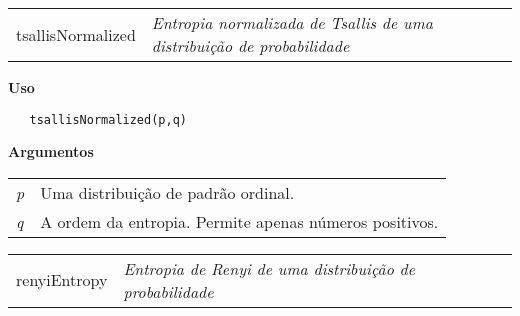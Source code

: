 \documentclass[12pt,letterpaper]{article}
\begin{document}
\newpage

\hrulefill   

\begin{table}[!h]
\begin{center}
\begin{tabularx}{\textwidth}{ X X}
\hspace{0.5cm} tsallisNormalized & \textit{Entropia normalizada de Tsallis de uma distribuição de probabilidade}\\
\end{tabularx}
\end{center}
\end{table} 

\vspace{-0.5cm}

\hrulefill  

\vspace{0.5cm}

\textbf{Uso}

\begin{lstlisting}
   tsallisNormalized(p,q)
\end{lstlisting}

\vspace{0.5cm}

\textbf{Argumentos}

\begin{table}[!h]
\begin{center}
\begin{tabularx}{\textwidth}{X X}
\hspace{0.5cm} \textit{p} \vspace{0.5cm}& Uma distribuição de padrão ordinal.\vspace{0.5cm}\\
\hspace{0.5cm} \textit{q} \vspace{0.5cm}&  A ordem da entropia. Permite apenas números positivos.\vspace{0.5cm}\\
\end{tabularx}
\end{center}
\end{table} 


\hrulefill   

\begin{table}[!h]
\begin{center}
\begin{tabularx}{\textwidth}{ X X}
\hspace{0.5cm} renyiEntropy & \textit{Entropia de Renyi de uma distribuição de probabilidade}\\
\end{tabularx}
\end{center}
\end{table} 
\end{document}
